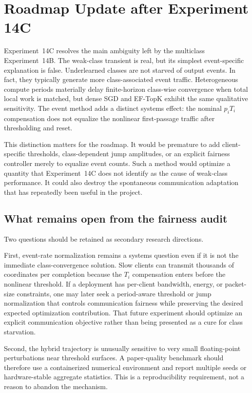 \section{Roadmap Update after Experiment 14C}
\label{sec:roadmap-post-14c}

Experiment~14C resolves the main ambiguity left by the multiclass Experiment~14B. The weak-class transient is real, but its simplest event-specific explanation is false. Underlearned classes are not starved of output events. In fact, they typically generate more class-associated event traffic. Heterogeneous compute periods materially delay finite-horizon class-wise convergence when total local work is matched, but dense SGD and EF-TopK exhibit the same qualitative sensitivity. The event method adds a distinct systems effect: the nominal $p_iT_i$ compensation does not equalize the nonlinear first-passage traffic after thresholding and reset.

This distinction matters for the roadmap. It would be premature to add client-specific thresholds, class-dependent jump amplitudes, or an explicit fairness controller merely to equalize event counts. Such a method would optimize a quantity that Experiment~14C does not identify as the cause of weak-class performance. It could also destroy the spontaneous communication adaptation that has repeatedly been useful in the project.

\subsection{What remains open from the fairness audit}

Two questions should be retained as secondary research directions.

First, event-rate normalization remains a systems question even if it is not the immediate class-convergence solution. Slow clients can transmit thousands of coordinates per completion because the $T_i$ compensation enters before the nonlinear threshold. If a deployment has per-client bandwidth, energy, or packet-size constraints, one may later seek a period-aware threshold or jump normalization that controls communication fairness while preserving the desired expected optimization contribution. That future experiment should optimize an explicit communication objective rather than being presented as a cure for class starvation.

Second, the hybrid trajectory is unusually sensitive to very small floating-point perturbations near threshold surfaces. A paper-quality benchmark should therefore use a containerized numerical environment and report multiple seeds or hardware-stable aggregate statistics. This is a reproducibility requirement, not a reason to abandon the mechanism.

